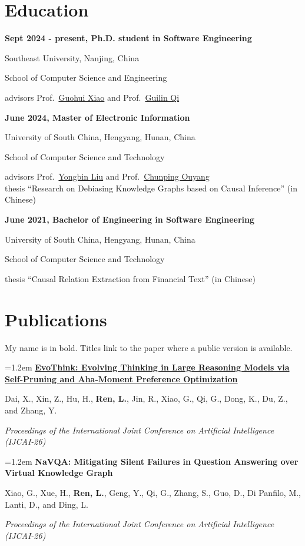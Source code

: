 \documentclass[11pt,a4paper]{article}
\newcommand{\yearhead}[1]{%
  \par\vspace{1.0em}%
  \noindent{\bfseries\large #1}%
  \par\vspace{-0.35em}%
}
\newcommand{\pubblock}[3]{%
  \par\vspace{0.55em}%
  \begingroup
  \setlength{\parindent}{0pt}%
  \interlinepenalty=10000
  \hangindent=1.2em\hangafter=1
  #1\par\nobreak
  #2\par\nobreak
  \textit{#3}\par
  \endgroup
}
\newcommand{\pubL}[5]{\pubblock{\href{#1}{\textbf{#2}}#5}{#3}{#4}}
\newcommand{\pubN}[4]{\pubblock{\textbf{#1}#4}{#2}{#3}}
\newcommand{\me}{\textbf{Ren, L.}}
\newcommand{\edu}[4]{%
  \par\vspace{0.55em}%
  \begingroup
  \setlength{\parindent}{0pt}%
  \interlinepenalty=10000
  \textbf{#1}\par\nobreak
  #2\par\nobreak
  #3\par\nobreak
  #4
  \endgroup
}
\begin{document}
\section{Education}

\edu{Sept 2024 - present, Ph.D. student in Software Engineering}
    {Southeast University, Nanjing, China}
    {School of Computer Science and Engineering}
    {advisors Prof.~\href{https://scholar.google.com/citations?user=hbek3dcAAAAJ}{Guohui Xiao}
     and Prof.~\href{https://scholar.google.com/citations?user=1gw3LJQAAAAJ}{Guilin Qi}}

\edu{June 2024, Master of Electronic Information}
    {University of South China, Hengyang, Hunan, China}
    {School of Computer Science and Technology}
    {advisors Prof.~\href{https://scholar.google.com/citations?user=9sXgL3MAAAAJ}{Yongbin Liu}
     and Prof.~\href{https://scholar.google.com/citations?user=JVw3XD0AAAAJ}{Chunping Ouyang}\\
     thesis ``Research on Debiasing Knowledge Graphs based on Causal Inference'' (in Chinese)}

\edu{June 2021, Bachelor of Engineering in Software Engineering}
    {University of South China, Hengyang, Hunan, China}
    {School of Computer Science and Technology}
    {thesis ``Causal Relation Extraction from Financial Text'' (in Chinese)}

\section{Publications}

\vspace{0.3em}
\noindent My name is in bold. Titles link to the paper where a public version is available.

\yearhead{2026}

\pubL{https://arxiv.org/abs/2607.19962}
     {EvoThink: Evolving Thinking in Large Reasoning Models via Self-Pruning and Aha-Moment Preference Optimization}
     {Dai, X., Xin, Z., Hu, H., \me, Jin, R., Xiao, G., Qi, G., Dong, K., Du, Z., and Zhang, Y.}
     {Proceedings of the International Joint Conference on Artificial Intelligence (IJCAI-26)}
     {}

\pubN{NaVQA: Mitigating Silent Failures in Question Answering over Virtual Knowledge Graph}
     {Xiao, G., Xue, H., \me, Geng, Y., Qi, G., Zhang, S., Guo, D., Di Panfilo, M., Lanti, D., and Ding, L.}
     {Proceedings of the International Joint Conference on Artificial Intelligence (IJCAI-26)}
     {}
\end{document}
